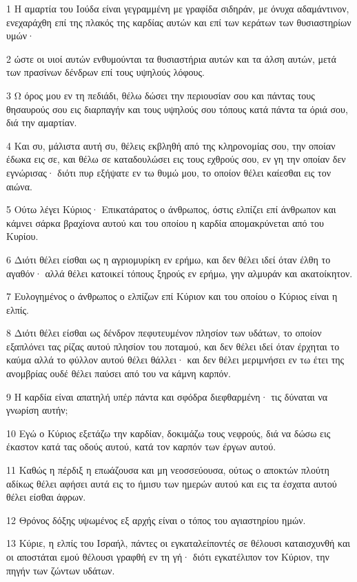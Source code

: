 \par 1 Η αμαρτία του Ιούδα είναι γεγραμμένη με γραφίδα σιδηράν, με όνυχα αδαμάντινον, ενεχαράχθη επί της πλακός της καρδίας αυτών και επί των κεράτων των θυσιαστηρίων υμών·
\par 2 ώστε οι υιοί αυτών ενθυμούνται τα θυσιαστήρια αυτών και τα άλση αυτών, μετά των πρασίνων δένδρων επί τους υψηλούς λόφους.
\par 3 Ω όρος μου εν τη πεδιάδι, θέλω δώσει την περιουσίαν σου και πάντας τους θησαυρούς σου εις διαρπαγήν και τους υψηλούς σου τόπους κατά πάντα τα όριά σου, διά την αμαρτίαν.
\par 4 Και συ, μάλιστα αυτή συ, θέλεις εκβληθή από της κληρονομίας σου, την οποίαν έδωκα εις σε, και θέλω σε καταδουλώσει εις τους εχθρούς σου, εν γη την οποίαν δεν εγνώρισας· διότι πυρ εξήψατε εν τω θυμώ μου, το οποίον θέλει καίεσθαι εις τον αιώνα.
\par 5 Ούτω λέγει Κύριος· Επικατάρατος ο άνθρωπος, όστις ελπίζει επί άνθρωπον και κάμνει σάρκα βραχίονα αυτού και του οποίου η καρδία απομακρύνεται από του Κυρίου.
\par 6 Διότι θέλει είσθαι ως η αγριομυρίκη εν ερήμω, και δεν θέλει ιδεί όταν έλθη το αγαθόν· αλλά θέλει κατοικεί τόπους ξηρούς εν ερήμω, γην αλμυράν και ακατοίκητον.
\par 7 Ευλογημένος ο άνθρωπος ο ελπίζων επί Κύριον και του οποίου ο Κύριος είναι η ελπίς.
\par 8 Διότι θέλει είσθαι ως δένδρον πεφυτευμένον πλησίον των υδάτων, το οποίον εξαπλόνει τας ρίζας αυτού πλησίον του ποταμού, και δεν θέλει ιδεί όταν έρχηται το καύμα αλλά το φύλλον αυτού θέλει θάλλει· και δεν θέλει μεριμνήσει εν τω έτει της ανομβρίας ουδέ θέλει παύσει από του να κάμνη καρπόν.
\par 9 Η καρδία είναι απατηλή υπέρ πάντα και σφόδρα διεφθαρμένη· τις δύναται να γνωρίση αυτήν;
\par 10 Εγώ ο Κύριος εξετάζω την καρδίαν, δοκιμάζω τους νεφρούς, διά να δώσω εις έκαστον κατά τας οδούς αυτού, κατά τον καρπόν των έργων αυτού.
\par 11 Καθώς η πέρδιξ η επωάζουσα και μη νεοσσεύουσα, ούτως ο αποκτών πλούτη αδίκως θέλει αφήσει αυτά εις το ήμισυ των ημερών αυτού και εις τα έσχατα αυτού θέλει είσθαι άφρων.
\par 12 Θρόνος δόξης υψωμένος εξ αρχής είναι ο τόπος του αγιαστηρίου ημών.
\par 13 Κύριε, η ελπίς του Ισραήλ, πάντες οι εγκαταλείποντές σε θέλουσι καταισχυνθή και οι αποστάται εμού θέλουσι γραφθή εν τη γή· διότι εγκατέλιπον τον Κύριον, την πηγήν των ζώντων υδάτων.
